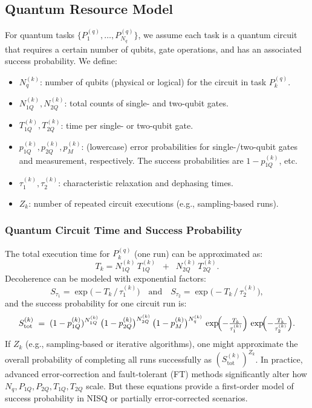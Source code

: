 \documentclass{article}
\begin{document}
\subsection{Quantum Resource Model}
For quantum tasks $\{P_1^{(q)}, \dots, P_{N_q}^{(q)}\}$, we assume each task is a quantum circuit that requires a certain number of qubits, gate operations, and has an associated success probability. We define:
\begin{itemize}
  \item $N_{q}^{(k)}$: number of qubits (physical or logical) for the circuit in task $P_k^{(q)}$.
  \item $N_{1Q}^{(k)}, N_{2Q}^{(k)}$: total counts of single- and two-qubit gates.
  \item $T_{1Q}^{(k)}, T_{2Q}^{(k)}$: time per single- or two-qubit gate.
  \item $p_{1Q}^{(k)}, p_{2Q}^{(k)}, p_{M}^{(k)}$: (lowercase) error probabilities for single-/two-qubit gates and measurement, respectively. The success probabilities are $1 - p_{1Q}^{(k)}$, etc.
  \item $\tau_1^{(k)}, \tau_2^{(k)}$: characteristic relaxation and dephasing times.
  \item $Z_k$: number of repeated circuit executions (e.g., sampling-based runs).
\end{itemize}

\subsubsection{Quantum Circuit Time and Success Probability}
The total execution time for $P_k^{(q)}$ (one run) can be approximated as:
\begin{equation}
T_k = N_{1Q}^{(k)} \, T_{1Q}^{(k)} \;\;+\;\; N_{2Q}^{(k)} \, T_{2Q}^{(k)}.
\end{equation}
Decoherence can be modeled with exponential factors:
\begin{equation}
S_{\tau_1}=\exp\!\bigl(-T_k \,/\, \tau_1^{(k)}\bigr)
\quad\text{and}\quad
S_{\tau_2}=\exp\!\bigl(-T_k \,/\, \tau_2^{(k)}\bigr),
\end{equation}
and the success probability for one circuit run is:
\begin{equation}
\label{eq:quantum_succ}
S_{\mathrm{tot}}^{(k)} \;=\; 
(1 - p_{1Q}^{(k)})^{N_{1Q}^{(k)}} 
\,\bigl(1 - p_{2Q}^{(k)}\bigr)^{N_{2Q}^{(k)}} 
\,\bigl(1 - p_{M}^{(k)}\bigr)^{N_{q}^{(k)}}
\, \exp\!\Bigl(-\tfrac{T_k}{\tau_1^{(k)}}\Bigr)
\, \exp\!\Bigl(-\tfrac{T_k}{\tau_2^{(k)}}\Bigr).
\end{equation}
If $Z_k$ (e.g., sampling-based or iterative algorithms), one might approximate the overall probability of completing all runs successfully as $(S_{\mathrm{tot}}^{(k)})^{Z_k}$. In practice, advanced error-correction and fault-tolerant (FT) methods significantly alter how $N_{q}, P_{1Q}, P_{2Q}, T_{1Q}, T_{2Q}$ scale. But these equations provide a first-order model of success probability in NISQ or partially error-corrected scenarios.
\end{document}
